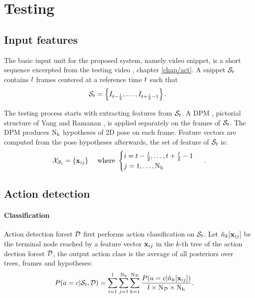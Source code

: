 \section{Testing}

\subsection{Input features}

The basic input unit for the proposed system, namely video snippet, is a short sequence excerpted from the testing video \cite{Schindler2008}, \cf chapter \ref{chap/act}. A snippet $\mathcal{S}_{t}$ contains $l$ frames centered at a reference time $t$ such that
\begin{equation}
	\label{eqn/body/snippetnow}
	\mathcal{S}_{t} = \left\{ I_{t - \frac{l}{2}}, \dots, I_{t + \frac{l}{2} - 1} \right\}.
\end{equation}

The testing process starts with extracting features from $\mathcal{S}_{t}$. A DPM , \eg pictorial structure of Yang and Ramanan \cite{Yang2011}, is applied separately on the frames of $\mathcal{S}_{t}$. The DPM produces $\mathrm{N_{h}}$ hypotheses of 2D pose on each frame. Feature vectors are computed from the pose hypotheses afterwards, the set of feature of $\mathcal{S}_{t}$ is:
\begin{equation}
	\begin{array}{lr}
		\mathcal{X}_{\mathcal{S}_{t}} = \{ \mathbf{x}_{ij}\} & \mbox{ where } 
		\begin{cases}
			i =t-\frac{l}{2},\dots,t+\frac{l}{2}-1 \\ 
			j=1,\dots,\mathrm{N_{h}}
		\end{cases}
	\end{array}.
\end{equation} 

\subsection{Action detection} 

\paragraph{Classification}
Action detection forest $\mathcal{D}$ first performs action classification on $\mathcal{S}_{t}$. Let ${\hat{n}}_k[\mathbf{x}_{ij}]$ be the terminal node reached by a feature vector $\mathbf{x}_{ij}$ in the $k$-th tree of the action dection forest $\mathcal{D}$, the output action class is the average of all posteriors over trees, frames and hypotheses:   
\begin{equation}
	\label{eqn/body/actionclassification} 
	\begin{aligned}
	P(a & = c | \mathcal{S}_{t}, \mathcal{D}) = \displaystyle \sum_{i = 1}^{l} \sum_{j = 1}^{\mathrm{N_{h}}} \sum_{k = 1}^{\mathrm{N_{\mathcal{D}}}} \frac {P(a=c|{\hat{n}}_{k}[\mathbf{x}_{ij}])} {l\times\mathrm{N_{\mathcal{D}}}\times\mathrm{N_{h}}}.
	\end{aligned}
\end{equation}

